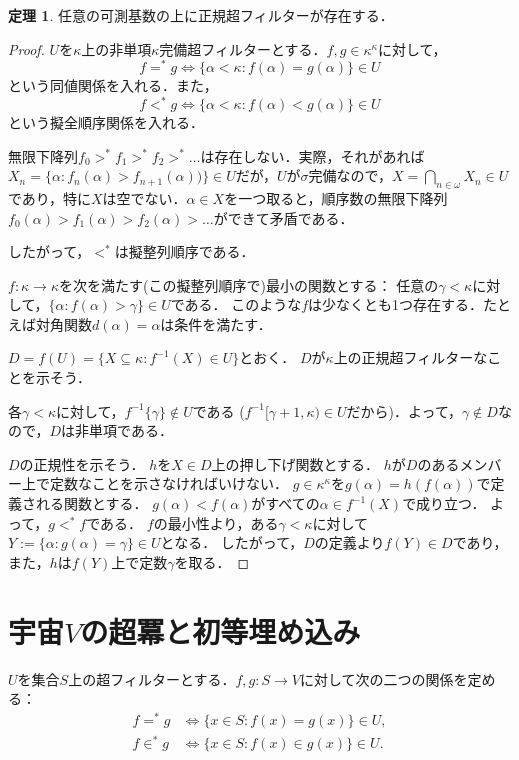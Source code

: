 \documentclass[uplatex]{jsarticle}
\renewcommand\subset{\subseteq}
\theoremstyle{definition}
\newtheorem{thm}{定理}[section]
\begin{document}
	\begin{thm}
		任意の可測基数の上に正規超フィルターが存在する．
	\end{thm}
	\begin{proof}
		$U$を$\kappa$上の非単項$\kappa$完備超フィルターとする．$f, g \in \kappa^\kappa$に対して，
		\[
		f =^* g \iff \{ \alpha < \kappa : f(\alpha) = g(\alpha)\} \in U
		\]
		という同値関係を入れる．また，
		\[
		f <^* g \iff \{ \alpha < \kappa : f(\alpha) < g(\alpha)\} \in U
		\]
		という擬全順序関係を入れる．
		
		無限下降列$f_0 >^* f_1 >^* f_2 >^* \dots$は存在しない．実際，それがあれば$X_n = \{ \alpha : f_n(\alpha) > f_{n+1}(\alpha))\} \in U$だが，$U$が$\sigma$完備なので，$X = \bigcap_{n \in \omega} X_n \in U$であり，特に$X$は空でない．$\alpha \in X$を一つ取ると，順序数の無限下降列$f_0(\alpha) > f_1(\alpha) > f_2(\alpha) > \dots$ができて矛盾である．
		
		したがって，$<^*$は擬整列順序である．
		
		$f \colon \kappa \to \kappa$を次を満たす(この擬整列順序で)最小の関数とする：
		任意の$\gamma < \kappa$に対して，$\{\alpha : f(\alpha) > \gamma \} \in U$である．
		このような$f$は少なくとも1つ存在する．たとえば対角関数$d(\alpha) = \alpha$は条件を満たす．
		
		$D = f(U) = \{ X \subset \kappa : f^{-1}(X) \in U \}$とおく．
		$D$が$\kappa$上の正規超フィルターなことを示そう．
		
		各$\gamma < \kappa$に対して，$f^{-1}\{\gamma\} \not \in U$である ($f^{-1}[\gamma+1, \kappa) \in U$だから)．よって，$\gamma \not \in D$なので，$D$は非単項である．
		
		$D$の正規性を示そう．
		$h$を$X \in D$上の押し下げ関数とする．
		$h$が$D$のあるメンバー上で定数なことを示さなければいけない．
		$g \in \kappa^\kappa$を$g(\alpha) = h(f(\alpha))$で定義される関数とする．
		$g(\alpha) < f(\alpha)$がすべての$\alpha \in f^{-1}(X)$で成り立つ．
		よって，$g <^* f$である．
		$f$の最小性より，ある$\gamma < \kappa$に対して $Y := \{ \alpha : g(\alpha) = \gamma\} \in U$となる．
		したがって，$D$の定義より$f(Y) \in D$であり，また，$h$は$f(Y)$上で定数$\gamma$を取る．
	\end{proof}
	
	\section{宇宙$V$の超冪と初等埋め込み}
	
	$U$を集合$S$上の超フィルターとする．$f, g \colon S \to V$に対して次の二つの関係を定める：
	\begin{align*}
		f =^* g &\iff \{ x \in S : f(x) = g(x) \} \in U, \\
		f \in^* g &\iff \{ x \in S : f(x) \in g(x) \} \in U.
	\end{align*}
\end{document}
